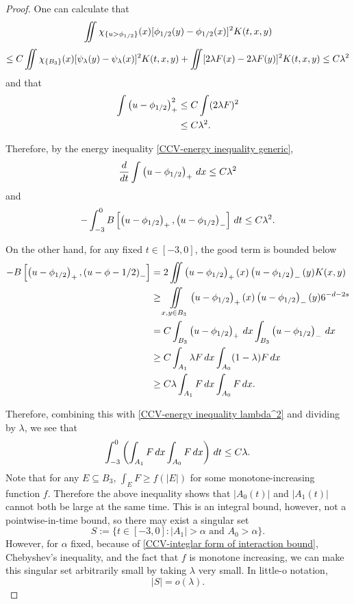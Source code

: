 \begin{proof}
One can calculate that
\[ \iint \chi_{\{u > \phi_{1/2}\}}(x) [\phi_{1/2}(y)-\phi_{1/2}(x)]^2 K(t,x,y) \]
\[ \leq C \iint \chi_{\{B_3\}}(x) [\psi_\lambda(y)-\psi_\lambda(x)]^2 K(t,x,y) + \iint [2\lambda F(x)-2 \lambda F(y)]^2 K(t,x,y) \leq C \lambda^2 \]
and that
\begin{align*} 
\int \left( u-\phi_{1/2} \right)_+^2 &\leq C \int (2\lambda F)^2
\\ &\leq C \lambda^2.
\end{align*}

Therefore, by the energy inequality \eqref{CCV-energy inequality generic}, 
\begin{equation} \label{CCV-derivative bound} \frac{d}{dt} \int \left( u-\phi_{1/2} \right)_+ \,dx \leq C \lambda^2 \end{equation}
and
\begin{equation} \label{CCV-energy inequality lambda^2}
- \int_{-3}^0 B\left[ \left( u-\phi_{1/2} \right)_+, \left( u-\phi_{1/2} \right)_- \right] \,dt \leq C \lambda^2.
\end{equation}

On the other hand, for any fixed $t \in [-3,0]$, the good term is bounded below
\begin{align*} 
-B\left[ \left( u-\phi_{1/2} \right)_+, \left( u-\phi-{1/2} \right)_- \right] &= 2 \iint \left( u-\phi_{1/2} \right)_+(x) \left( u-\phi_{1/2} \right)_-(y) K(x,y)
\\ & \geq \iint\limits_{x,y \in B_3} \left( u-\phi_{1/2} \right)_+(x) \left( u-\phi_{1/2} \right)_-(y) 6^{-d-2s}
\\ &= C \int_{B_3} \left( u-\phi_{1/2} \right)_+ \,dx \int_{B_3} \left( u-\phi_{1/2} \right)_- \,dx
\\ &\geq C \int_{A_1} \lambda F \,dx \int_{A_0} (1-\lambda) F \,dx
\\ &\geq C \lambda \int_{A_1} F \,dx \int_{A_0} F \,dx.
\end{align*}

Therefore, combining this with \eqref{CCV-energy inequality lambda^2} and dividing by $\lambda$, we see that
\begin{equation} \label{CCV-integlar form of interaction bound} \int_{-3}^0 \left(  \int_{A_1} F \,dx \int_{A_0} F \,dx  \right)\,dt \leq C \lambda. \end{equation}
Note that for any $E \subseteq B_3$, $\int_E F \geq f(|E|)$ for some monotone-increasing function $f$.%
Therefore the above inequality shows that $|A_0(t)|$ and $|A_1(t)|$ cannot both be large at the same time.  
This is an integral bound, however, not a pointwise-in-time bound, so there may exist a singular set
\[ S := \{ t \in [-3,0]: |A_1|>\alpha \textrm{ and } A_0 > \alpha\}. \]
However, for $\alpha$ fixed, because of \eqref{CCV-integlar form of interaction bound}, Chebyshev's inequality, and the fact that $f$ is monotone increasing, we can make this singular set arbitrarily small by taking $\lambda$ very small.  In little-o notation,
\begin{equation} \label{CCV-small measure of overlap} 
|S| = o(\lambda).
\end{equation}



\end{proof}
